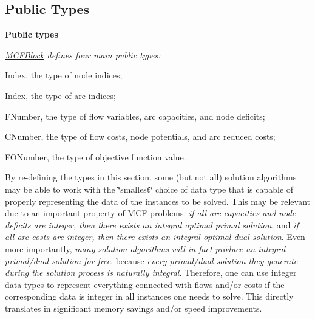 \subsection*{Public Types}
\begin{Indent}\textbf{ Public types}\par
{\em \mbox{\hyperlink{class_s_m_spp__di__unipi__it_1_1_m_c_f_block}{M\+C\+F\+Block}} defines four main public types\+:


\begin{DoxyItemize}
\item Index, the type of node indices;
\item Index, the type of arc indices;
\item F\+Number, the type of flow variables, arc capacities, and node deficits;
\item C\+Number, the type of flow costs, node potentials, and arc reduced costs;
\item F\+O\+Number, the type of objective function value.
\end{DoxyItemize}

By re-\/defining the types in this section, some (but not all) solution algorithms may be able to work with the \char`\"{}smallest\char`\"{} choice of data type that is capable of properly representing the data of the instances to be solved. This may be relevant due to an important property of M\+CF problems\+: {\itshape if all arc capacities and node deficits are integer, then there exists an integral optimal primal solution}, and {\itshape if all arc costs are integer, then there exists an integral optimal dual solution}. Even more importantly, {\itshape many solution algorithms will in fact produce an integral primal/dual solution for free}, because {\itshape every primal/dual solution they generate during the solution process is naturally integral}. Therefore, one can use integer data types to represent everything connected with flows and/or costs if the corresponding data is integer in all instances one needs to solve. This directly translates in significant memory savings and/or speed improvements.

}
\end{Indent}
